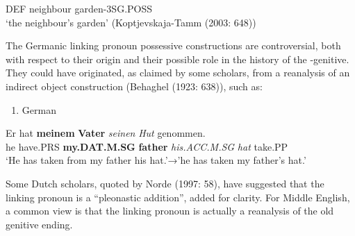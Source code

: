 DEF  neighbour  garden-3SG.POSS\\ %


‘the neighbour’s garden’ (Koptjevskaja-Tamm (2003: 648)) 
\z

The Germanic linking pronoun possessive constructions are controversial, both with respect to their origin and their possible role in the history of the -genitive. They could have originated, as claimed by some scholars, from a reanalysis of an indirect object construction (Behaghel (1923: 638)), such as:

\begin{enumerate} %
\item 
German

\end{enumerate} %
\ea\label{}
\gll Er  hat  \textbf{meinem}\textbf{  Vater} \textit{seinen}\textit{  Hut}\textit{  }genommen.\\


he  have.PRS  \textbf{my.DAT.M.SG} \textbf{father} \textit{his.ACC.M.SG}\textit{  }\textit{hat}\textit{  }take.PP\\ %


‘He has taken from my father his hat.’→’he has taken my father’s hat.’
\z


Some Dutch scholars, quoted by Norde (1997: 58), have suggested that the linking pronoun is a “pleonastic addition”, added for clarity. For Middle English, a common view is that the linking pronoun  is actually a reanalysis of the old genitive ending.

